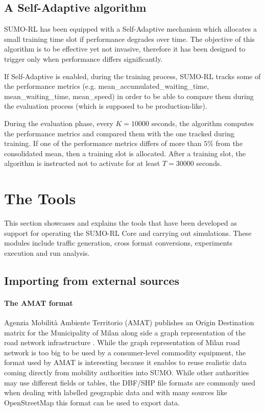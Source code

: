 \subsection{A Self-Adaptive algorithm}

SUMO-RL has been equipped with a Self-Adaptive mechanism which allocates a small training time slot if performance degrades over time.
The objective of this algorithm is to be effective yet not invasive, therefore it has been designed to trigger only when performance differs significantly.

If Self-Adaptive is enabled, during the training process, SUMO-RL tracks some of the performance metrics (e.g. mean\_accumulated\_waiting\_time, mean\_waiting\_time, mean\_speed) in order to be able to compare them during the evaluation process (which is supposed to be production-like).

During the evaluation phase, every $K = 10000$ seconds, the algorithm computes the performance metrics and compared them with the one tracked during training.
If one of the performance metrics differs of more than $5\%$ from the consolidated mean, then a training slot is allocated.
After a training slot, the algorithm is instructed not to activate for at least $T = 30000$ seconds.

\section{The Tools}

This section showcases and explains the tools that have been developed as support for operating the SUMO-RL Core and carrying out simulations.
These modules include traffic generation, cross format conversions, experiments execution and run analysis.

\subsection{Importing from external sources}

\paragraph{The AMAT format}

Agenzia Mobilit\`a Ambiente Territorio (AMAT) publishes an Origin Destination matrix for the Municipality of Milan along side a graph representation of the road network infrastructure \cite{ODMilano2010}.
While the graph representation of Milan road network is too big to be used by a consumer-level commodity equipment, the format used by AMAT is interesting because it enables to reuse realistic data coming directly from mobility authorities into SUMO.
While other authorities may use different fields or tables, the DBF/SHP file formats are commonly used when dealing with labelled geographic data and with many sources like OpenStreetMap this format can be used to export data.

